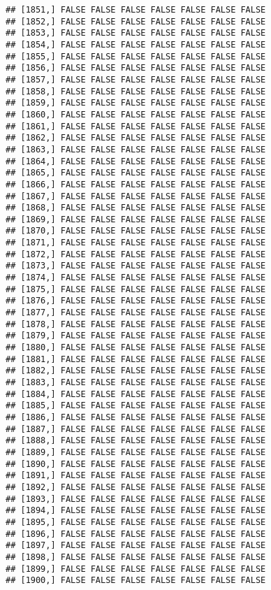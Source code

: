 \documentclass[
]{article}
\begin{document}
\begin{verbatim}
## [1851,] FALSE FALSE FALSE FALSE FALSE FALSE FALSE
## [1852,] FALSE FALSE FALSE FALSE FALSE FALSE FALSE
## [1853,] FALSE FALSE FALSE FALSE FALSE FALSE FALSE
## [1854,] FALSE FALSE FALSE FALSE FALSE FALSE FALSE
## [1855,] FALSE FALSE FALSE FALSE FALSE FALSE FALSE
## [1856,] FALSE FALSE FALSE FALSE FALSE FALSE FALSE
## [1857,] FALSE FALSE FALSE FALSE FALSE FALSE FALSE
## [1858,] FALSE FALSE FALSE FALSE FALSE FALSE FALSE
## [1859,] FALSE FALSE FALSE FALSE FALSE FALSE FALSE
## [1860,] FALSE FALSE FALSE FALSE FALSE FALSE FALSE
## [1861,] FALSE FALSE FALSE FALSE FALSE FALSE FALSE
## [1862,] FALSE FALSE FALSE FALSE FALSE FALSE FALSE
## [1863,] FALSE FALSE FALSE FALSE FALSE FALSE FALSE
## [1864,] FALSE FALSE FALSE FALSE FALSE FALSE FALSE
## [1865,] FALSE FALSE FALSE FALSE FALSE FALSE FALSE
## [1866,] FALSE FALSE FALSE FALSE FALSE FALSE FALSE
## [1867,] FALSE FALSE FALSE FALSE FALSE FALSE FALSE
## [1868,] FALSE FALSE FALSE FALSE FALSE FALSE FALSE
## [1869,] FALSE FALSE FALSE FALSE FALSE FALSE FALSE
## [1870,] FALSE FALSE FALSE FALSE FALSE FALSE FALSE
## [1871,] FALSE FALSE FALSE FALSE FALSE FALSE FALSE
## [1872,] FALSE FALSE FALSE FALSE FALSE FALSE FALSE
## [1873,] FALSE FALSE FALSE FALSE FALSE FALSE FALSE
## [1874,] FALSE FALSE FALSE FALSE FALSE FALSE FALSE
## [1875,] FALSE FALSE FALSE FALSE FALSE FALSE FALSE
## [1876,] FALSE FALSE FALSE FALSE FALSE FALSE FALSE
## [1877,] FALSE FALSE FALSE FALSE FALSE FALSE FALSE
## [1878,] FALSE FALSE FALSE FALSE FALSE FALSE FALSE
## [1879,] FALSE FALSE FALSE FALSE FALSE FALSE FALSE
## [1880,] FALSE FALSE FALSE FALSE FALSE FALSE FALSE
## [1881,] FALSE FALSE FALSE FALSE FALSE FALSE FALSE
## [1882,] FALSE FALSE FALSE FALSE FALSE FALSE FALSE
## [1883,] FALSE FALSE FALSE FALSE FALSE FALSE FALSE
## [1884,] FALSE FALSE FALSE FALSE FALSE FALSE FALSE
## [1885,] FALSE FALSE FALSE FALSE FALSE FALSE FALSE
## [1886,] FALSE FALSE FALSE FALSE FALSE FALSE FALSE
## [1887,] FALSE FALSE FALSE FALSE FALSE FALSE FALSE
## [1888,] FALSE FALSE FALSE FALSE FALSE FALSE FALSE
## [1889,] FALSE FALSE FALSE FALSE FALSE FALSE FALSE
## [1890,] FALSE FALSE FALSE FALSE FALSE FALSE FALSE
## [1891,] FALSE FALSE FALSE FALSE FALSE FALSE FALSE
## [1892,] FALSE FALSE FALSE FALSE FALSE FALSE FALSE
## [1893,] FALSE FALSE FALSE FALSE FALSE FALSE FALSE
## [1894,] FALSE FALSE FALSE FALSE FALSE FALSE FALSE
## [1895,] FALSE FALSE FALSE FALSE FALSE FALSE FALSE
## [1896,] FALSE FALSE FALSE FALSE FALSE FALSE FALSE
## [1897,] FALSE FALSE FALSE FALSE FALSE FALSE FALSE
## [1898,] FALSE FALSE FALSE FALSE FALSE FALSE FALSE
## [1899,] FALSE FALSE FALSE FALSE FALSE FALSE FALSE
## [1900,] FALSE FALSE FALSE FALSE FALSE FALSE FALSE

\end{verbatim}
\end{document}
